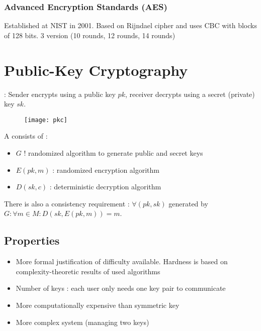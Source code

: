 \subsection{Advanced Encryption Standards (AES)}

Established at NIST in 2001. Based on Rijndael cipher and uses CBC with blocks of 128 bits. 3 version (10 rounds, 12 rounds, 14 rounds)

\chapter{Public-Key Cryptography}

 : Sender encrypts using a public key $pk$, receiver decrypts using a secret (private) key $sk$.

\begin{figure}[H]
    \centering
    \texttt{[image: pkc]}
\end{figure}

A  consists of :
\begin{itemize}
    \item $G$ ! randomized algorithm to generate public and secret keys
    \item $E(pk, m)$ : randomized encryption algorithm
    \item $D(sk, c)$ : deterministic decryption algorithm
\end{itemize}

There is also a consistency requirement : $\forall (pk, sk)$ generated by $G : \forall m \in M : D(sk, E(pk, m)) = m$.

\section{Properties}

\begin{minipage}[t]{0.45\textwidth}
    \begin{itemize}
        \item More formal justification of difficulty available. Hardness is based on complexity-theoretic results of used algorithms
        \item Number of keys : each user only needs one key pair to communicate
    \end{itemize}
\end{minipage}
\hfill
\begin{minipage}[t]{0.45\textwidth}
    \begin{itemize}
        \item More computationally expensive than symmetric key
        \item More complex system (managing two keys)
    \end{itemize}
\end{minipage}

